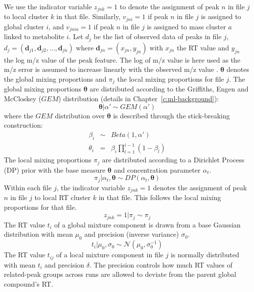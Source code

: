 We use the indicator variable $z_{jnk}=1$ to denote the assignment of peak $n$ in file $j$ to local cluster $k$ in that file. Similarly, $v_{jni}=1$ if peak $n$ in file $j$ is assigned to global cluster $i$, and $v_{jnia}=1$ if peak $n$ in file $j$ is assigned to mass cluster $a$ linked to metabolite $i$. Let $d_{j}$ be the list of observed data of peaks in file $j$, $d_{j}=(\mathbf{d}_{j1},\mathbf{d}_{j2},...,\mathbf{d}_{jn})$ where $\mathbf{d}_{jn}=(x_{jn},y_{jn})$ with $x_{jn}$ the RT value and $y_{jn}$ the log m/z value of the peak feature. The log of m/z value is here used as the m/z error is assumed to increase linearly with the observed m/z value \cite{Perera2011}. $\boldsymbol{\theta}$ denotes the global mixing proportions and $\pi_{j}$ the local mixing proportions for file $j$. The global mixing proportions $\boldsymbol{\theta}$ are distributed according to the Griffiths, Engen and McCloskey ($GEM$) distribution (details in Chapter~\ref{c:ml-background}):
\begin{equation}
    \boldsymbol{\theta} \vert \alpha'\sim GEM(\alpha')
\end{equation}
where the $GEM$ distribution over $\boldsymbol{\theta}$ is described through the stick-breaking construction: 
\begin{eqnarray}
	\beta_{i} & \sim & Beta(1,\alpha')\\
	\theta_{i} & = & \beta_{i}\prod_{l=1}^{i-1}(1-\beta_{l})
\end{eqnarray}
The local mixing proportions $\pi_{j}$ are distributed according to a Dirichlet Process (DP) prior with the base measure $\boldsymbol{\theta}$ and concentration parameter $\alpha_{t}$. 
\begin{equation}
	\pi_{j} \vert \alpha_{t},\boldsymbol{\theta}\sim DP(\alpha_{t},\boldsymbol{\theta})
\end{equation}
Within each file $j$, the indicator variable $z_{jnk}=1$ denotes the assignment of peak $n$ in file $j$ to local RT cluster $k$ in that file. This follows the local mixing proportions for that file.
\begin{equation}
	z_{jnk}=1 \vert \pi_{j}\sim\pi_{j}
\end{equation}
The RT value $t_{i}$ of a global mixture component is drawn from a base Gaussian distribution with mean $\mu_{0}$ and precision (inverse variance) $\sigma_{0}$. 
\begin{equation}
	t_{i} \vert \mu_{0},\sigma_{0}\sim\mathcal{N}(\mu_{0},\sigma_{0}^{-1})\label{eq:draw_ti}
\end{equation}
The RT value $t_{ij}$ of a local mixture component in file $j$ is normally distributed with mean $t_{i}$ and precision $\delta$. The precision controls how much RT values of related-peak groups across runs are allowed to deviate from the parent global compound's RT. 
